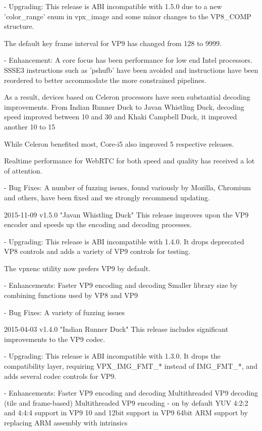\begin{DoxyVerbInclude}
  - Upgrading:
    This release is ABI incompatible with 1.5.0 due to a new 'color_range' enum
    in vpx_image and some minor changes to the VP8_COMP structure.

    The default key frame interval for VP9 has changed from 128 to 9999.

  - Enhancement:
    A core focus has been performance for low end Intel processors. SSSE3
    instructions such as 'pshufb' have been avoided and instructions have been
    reordered to better accommodate the more constrained pipelines.

    As a result, devices based on Celeron processors have seen substantial
    decoding improvements. From Indian Runner Duck to Javan Whistling Duck,
    decoding speed improved between 10 and 30%
    and Khaki Campbell Duck, it improved another 10 to 15%

    While Celeron benefited most, Core-i5 also improved 5%
    respective releases.

    Realtime performance for WebRTC for both speed and quality has received a
    lot of attention.

  - Bug Fixes:
    A number of fuzzing issues, found variously by Mozilla, Chromium and others,
    have been fixed and we strongly recommend updating.

2015-11-09 v1.5.0 "Javan Whistling Duck"
  This release improves upon the VP9 encoder and speeds up the encoding and
  decoding processes.

  - Upgrading:
    This release is ABI incompatible with 1.4.0. It drops deprecated VP8
    controls and adds a variety of VP9 controls for testing.

    The vpxenc utility now prefers VP9 by default.

  - Enhancements:
    Faster VP9 encoding and decoding
    Smaller library size by combining functions used by VP8 and VP9

  - Bug Fixes:
    A variety of fuzzing issues

2015-04-03 v1.4.0 "Indian Runner Duck"
  This release includes significant improvements to the VP9 codec.

  - Upgrading:
    This release is ABI incompatible with 1.3.0. It drops the compatibility
    layer, requiring VPX_IMG_FMT_* instead of IMG_FMT_*, and adds several codec
    controls for VP9.

  - Enhancements:
    Faster VP9 encoding and decoding
    Multithreaded VP9 decoding (tile and frame-based)
    Multithreaded VP9 encoding - on by default
    YUV 4:2:2 and 4:4:4 support in VP9
    10 and 12bit support in VP9
    64bit ARM support by replacing ARM assembly with intrinsics


\end{DoxyVerbInclude}
